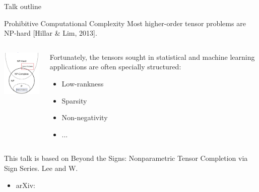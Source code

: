 \documentclass[10pt, mathserif]{beamer} %
\theoremstyle{definition}
\theoremstyle{plain}
\begin{document}
\begin{frame}[noframenumbering]{Talk outline} 
 \begin{alertblock}{Prohibitive Computational Complexity}
Most higher-order tensor problems are NP-hard [Hillar \& Lim, 2013].
\end{alertblock}


\begin{columns}[T] \begin{column}{.4\textwidth}
\centering
\includegraphics[width=3cm]{Figures/NP.png}
\end{column}%
\hfill%
\begin{column}{.6\textwidth}
Fortunately, the tensors sought in statistical and machine learning applications are often \color{red}specially structured:
\begin{itemize}
\item Low-rankness
\item Sparsity
\item Non-negativity
\item ...
\end{itemize}
\end{column}%
\end{columns}

\begin{block}{This talk is based on}
{\footnotesize
{\color{blue}Beyond the Signs: Nonparametric Tensor Completion via Sign Series.} Lee and W.}
\begin{itemize}
\item arXiv: 
\end{itemize}

\end{block}
\end{frame}
\end{document}
